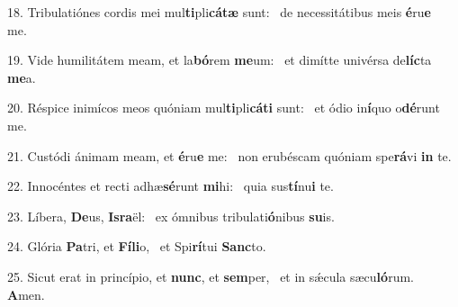 18. Tribulatiónes cordis mei mul\textbf{ti}pli\textbf{cá}\textbf{tæ} sunt: \ast\  de necessitátibus meis \textbf{é}ru\textbf{e} me.\

19. Vide humilitátem meam, et la\textbf{bó}rem \textbf{me}um: \ast\  et dimítte univérsa de\textbf{líc}ta \textbf{me}a.\

20. Réspice inimícos meos quóniam mul\textbf{ti}pli\textbf{cá}\textbf{ti} sunt: \ast\  et ódio in\textbf{í}quo o\textbf{dé}runt me.\

21. Custódi ánimam meam, et \textbf{é}ru\textbf{e} me: \ast\  non erubéscam quóniam spe\textbf{rá}vi \textbf{in} te.\

22. Innocéntes et recti adhæ\textbf{sé}runt \textbf{mi}hi: \ast\  quia sus\textbf{tí}nu\textbf{i} te.\

23. Líbera, \textbf{De}us, \textbf{Is}\textbf{ra}ël: \ast\  ex ómnibus tribulati\textbf{ó}nibus \textbf{su}is.\

24. Glória \textbf{Pa}tri, et \textbf{Fí}\textbf{li}o, \ast\  et Spi\textbf{rí}tui \textbf{Sanc}to.\

25. Sicut erat in princípio, et \textbf{nunc}, et \textbf{sem}per, \ast\  et in sǽcula sæcu\textbf{ló}rum. \textbf{A}men.\

